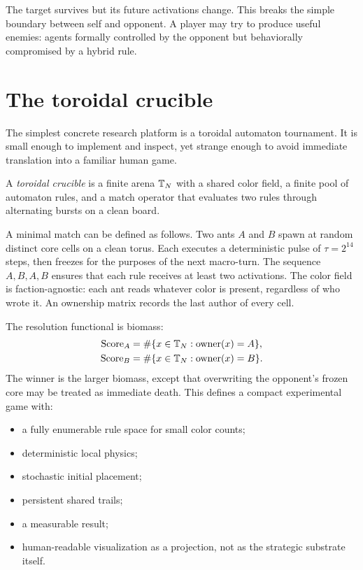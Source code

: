 The target survives but its future activations change. This breaks the simple boundary between self and opponent. A player may try to produce useful enemies: agents formally controlled by the opponent but behaviorally compromised by a hybrid rule.

\section{The toroidal crucible}\label{sec:crucible}

The simplest concrete research platform is a toroidal automaton tournament. It is small enough to implement and inspect, yet strange enough to avoid immediate translation into a familiar human game.

\begin{definition}\label{def:crucible}
A \emph{toroidal crucible} is a finite arena $\mathbb{T}_N$ with a shared color field, a finite pool of automaton rules, and a match operator that evaluates two rules through alternating bursts on a clean board.
\end{definition}

A minimal match can be defined as follows. Two ants $A$ and $B$ spawn at random distinct core cells on a clean torus. Each executes a deterministic pulse of $\tau=2^{14}$ steps, then freezes for the purposes of the next macro-turn. The sequence $A,B,A,B$ ensures that each rule receives at least two activations. The color field is faction-agnostic: each ant reads whatever color is present, regardless of who wrote it. An ownership matrix records the last author of every cell.

The resolution functional is biomass:
\[
  \begin{aligned}
  \operatorname{Score}_A&=\#\{x\in\mathbb{T}_N:\mathrm{owner}(x)=A\},\\
  \operatorname{Score}_B&=\#\{x\in\mathbb{T}_N:\mathrm{owner}(x)=B\}.
  \end{aligned}
\]
The winner is the larger biomass, except that overwriting the opponent's frozen core may be treated as immediate death. This defines a compact experimental game with:
\begin{itemize}
  \item a fully enumerable rule space for small color counts;
  \item deterministic local physics;
  \item stochastic initial placement;
  \item persistent shared trails;
  \item a measurable result;
  \item human-readable visualization as a projection, not as the strategic substrate itself.
\end{itemize}


